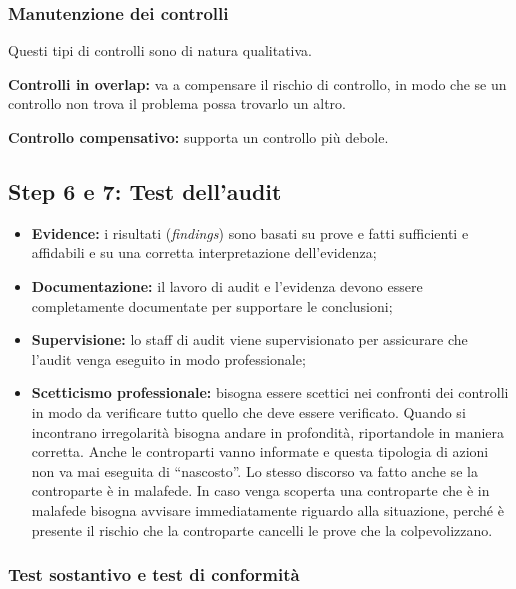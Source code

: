 \subsubsection{Manutenzione dei controlli}

Questi tipi di controlli sono di natura qualitativa.

\textbf{Controlli in overlap:} va a compensare il rischio di controllo, in modo
che se un controllo non trova il problema possa trovarlo un altro.

\textbf{Controllo compensativo:} supporta un controllo più debole.

\subsection{Step 6 e 7: Test dell'audit}

\begin{itemize}
\item \textbf{Evidence:} i risultati (\emph{findings}) sono basati su prove e
fatti sufficienti e affidabili e su una corretta interpretazione dell'evidenza;

\item \textbf{Documentazione:} il lavoro di audit e l'evidenza
devono essere completamente documentate per supportare le conclusioni;

\item \textbf{Supervisione:} lo staff di audit viene supervisionato per
assicurare che l'audit venga eseguito in modo professionale;

\item \textbf{Scetticismo professionale:} bisogna essere scettici nei confronti
dei controlli in modo da verificare tutto quello che deve essere verificato.
Quando si incontrano irregolarità bisogna andare in profondità, riportandole
in maniera corretta. Anche le controparti vanno informate e questa tipologia di
azioni non va mai eseguita di ``nascosto''. Lo stesso discorso va fatto anche
se la controparte è in malafede. In caso venga scoperta una controparte che è in
malafede bisogna avvisare immediatamente riguardo alla situazione, perché è
presente il rischio che la controparte cancelli le prove che la colpevolizzano.
\end{itemize}

\subsubsection*{Test sostantivo e test di conformità}


